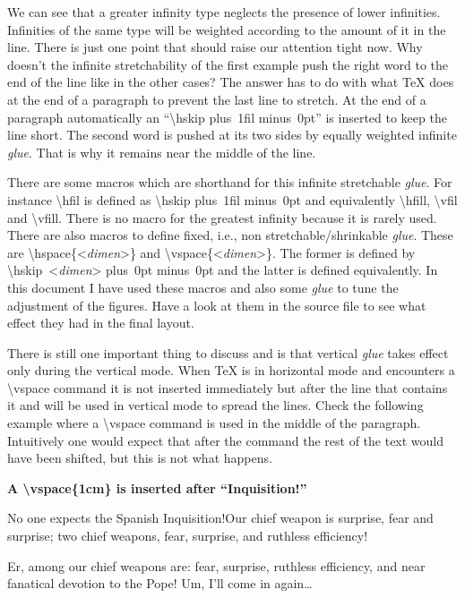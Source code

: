 \documentclass[a4paper]{article}
\newcommand{\bs}[1]{{\rmfamily\color{blue}\textbackslash{}#1}}
\newenvironment{example}[1]{%
\vspace{10pt}
\noindent\textbf{#1}\sffamily\par\vspace{10pt}%
}
{%
\par\vspace{10pt}
}
\begin{document}
We can see that a greater infinity type neglects the presence of lower infinities. Infinities of the same type will be weighted according to the amount of it in the line. There is just one point that should raise our attention tight now. Why doesn't the infinite stretchability of the first example push the right word to the end of the line like in the other cases? The answer has to do with what \TeX{} does at the end of a paragraph to prevent the last line to stretch. At the end of a paragraph automatically an ``\bs{hskip} {\ttfamily 0pt plus~1fil minus~0pt}'' is inserted to keep the line short. The second word is pushed at its two sides by equally weighted infinite \emph{glue}. That is why it remains near the middle of the line.

There are some macros which are shorthand for this infinite stretchable \emph{glue}. For instance \bs{hfil} is defined as \bs{hskip} {\ttfamily 0pt plus~1fil minus~0pt} and equivalently \bs{hfill}, \bs{vfil} and \bs{vfill}. There is no macro for the greatest infinity because it is rarely used. There are also macros to define fixed, i.e., non stretchable/shrinkable \emph{glue}. These are \bs{hspace}\{<\textsf{\itshape dimen}>\} and \bs{vspace}\{<\textsf{\itshape dimen}>\}. The former is defined by \bs{hskip}{\ttfamily~<\textsf{\itshape dimen}> plus~0pt minus~0pt} and the latter is defined equivalently. In this document I have used these macros and also some \emph{glue} to tune the adjustment of the figures. Have a look at them in the source file to see what effect they had in the final layout. 

There is still one important  thing to discuss and is that vertical \emph{glue} takes effect only during the vertical mode. When \TeX{} is in horizontal mode and encounters a \bs{vspace} command it is not inserted immediately but after the line that contains it and will be used in vertical mode to spread the lines. Check the following example where a \bs{vspace} command is used in the middle of the paragraph. Intuitively one would expect that after the command the rest of the text would have been shifted, but this is not what happens.

\newpage\begin{example}{A \bs{vspace}\{1cm\} is inserted after ``Inquisition!''}
No one expects the Spanish Inquisition!\vspace{1cm}Our chief weapon is surprise, fear and surprise; two chief weapons, fear, surprise, and ruthless efficiency! 

Er, among our chief weapons are: fear, surprise, ruthless efficiency, and near fanatical devotion to the Pope! Um, I'll come in again\dots
\end{example}
\end{document}
